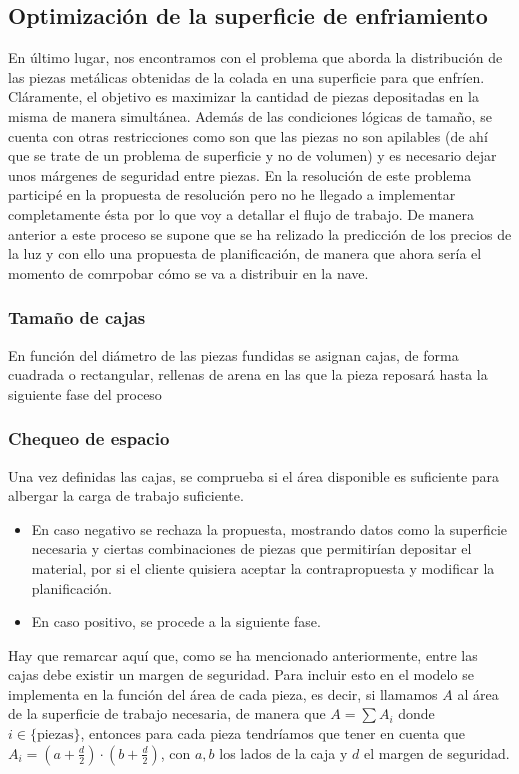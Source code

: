 \subsection{Optimización de la superficie de enfriamiento}
%
%
En último lugar, nos encontramos con el problema que aborda la distribución de las piezas metálicas obtenidas de la colada en una superficie para que enfríen. Cláramente, el objetivo es maximizar la cantidad de piezas depositadas en la misma de manera simultánea. Además de las condiciones lógicas de tamaño, se cuenta con otras restricciones como son que las piezas no son apilables (de ahí que se trate de un problema de superficie y no de volumen) y es necesario dejar unos márgenes de seguridad entre piezas. En la resolución de este problema participé en la propuesta de resolución pero no he llegado a implementar completamente ésta por lo que voy a detallar el flujo de trabajo. De manera anterior a este proceso se supone que se ha relizado la predicción de los precios de la luz y con ello una propuesta de planificación, de manera que ahora sería el momento de comrpobar cómo se va a distribuir en la nave.
\subsubsection{Tamaño de cajas}
     En función del diámetro de las piezas fundidas se asignan cajas, de forma cuadrada o rectangular, rellenas de arena en las que la pieza reposará hasta la siguiente fase del proceso
\subsubsection{Chequeo de espacio} Una vez definidas las cajas, se comprueba si el área disponible es suficiente para albergar la carga de trabajo suficiente.
\begin{itemize}
    \item En caso negativo se rechaza la propuesta, mostrando datos como la superficie necesaria y ciertas combinaciones de piezas que permitirían depositar el material, por si el cliente quisiera aceptar la contrapropuesta y modificar la planificación.
    \item En caso positivo, se procede a la siguiente fase.
   \end{itemize}
Hay que remarcar aquí que, como se ha mencionado anteriormente, entre las cajas debe existir un margen de seguridad. Para incluir esto en el modelo se implementa en la función del área de cada pieza, es decir, si llamamos $A$ al área de la superficie de trabajo necesaria, de manera que $A = \sum A_i$ donde $i \in \{\text{piezas}\}$, entonces para cada pieza tendríamos que tener en cuenta que $A_i = (a+\frac{d}{2})\cdot(b+\frac{d}{2})$, con $a,b$ los lados de la caja y $d$ el margen de seguridad.
